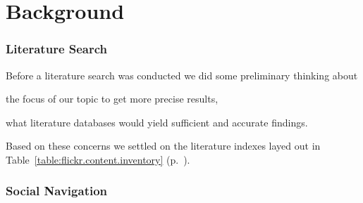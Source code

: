 \chapter{Background}

%
%
%
%
%
%
%

\subsection{Literature Search}

Before a literature search was conducted we did some preliminary thinking
about
\begin{inparaenum}[(a)]
  \item the focus of our topic to get more precise results,
  \item what literature databases would yield sufficient and accurate
    findings.
\end{inparaenum}
Based on these concerns we settled on the literature indexes layed out in
Table~\ref{table:flickr.content.inventory}
(p.~\pageref{table:flickr.content.inventory}).


\subsection{Social Navigation}
